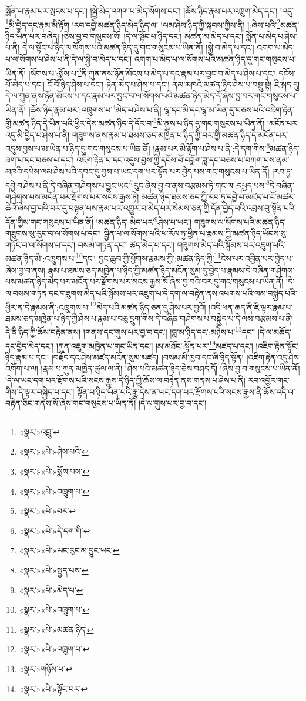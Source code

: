 སྨོན་པ་རྣམ་པར་སྤངས་པ་དང་། །སྐྱེ་མེད་འགག་པ་མེད་སོགས་དང་། །ཆོས་ཉིད་རྣམ་པར་འཁྲུག་མེད་དང་། །འདུ་\footnote{«སྣར་»འབྲུ་}མི་བྱེད་དང་རྣམ་མི་རྟོག །རབ་དབྱེ་མཚན་ཉིད་མེད་ཉིད་ལ། །ལམ་ཤེས་ཉིད་ཀྱི་སྐབས་ཀྱིས་ནི། །:ཞེས་པའི་\footnote{«སྣར་»«པེ་»ཤེས་པའི་}མཚན་ཉིད་ཡིན་པར་བཞེད། །ཅེས་བྱ་བ་གསུངས་སོ། །དེ་ལ་སྟོང་པ་ཉིད་དང་། མཚན་མ་མེད་པ་དང་། སྨོན་པ་མེད་པ་ཤེས་པ་ནི། དེ་ལ་སྟོང་པ་ཉིད་ལ་སོགས་པའི་མཚན་ཉིད་དུ་གང་གསུངས་པ་ཡིན་ནོ། །སྐྱེ་བ་མེད་པ་དང་། འགག་པ་མེད་པ་ལ་སོགས་པ་ཤེས་པ་ནི་དེ་ལ་སྐྱེ་བ་མེད་པ་དང་། འགག་པ་མེད་པ་ལ་སོགས་པའི་མཚན་ཉིད་དུ་གང་གསུངས་པ་ཡིན་ནོ། །སོགས་པ་:སྨོས་པ་\footnote{«སྣར་»«པེ་»སྨོས་པས་}ནི་ཀུན་ནས་ཉོན་མོངས་པ་མེད་པ་དང་རྣམ་པར་བྱང་བ་མེད་པ་ཤེས་པ་དང་། དངོས་པོ་མེད་པ་དང་། ངོ་བོ་ཉིད་ཤེས་པ་དང་། རྟེན་མེད་པ་ཤེས་པ་དང་། ནམ་མཁའི་མཚན་ཉིད་ཤེས་པ་བསྡུ་སྟེ། ཇི་སྐད་དུ། དེ་ལ་ཀུན་ནས་ཉོན་མོངས་པ་དང་རྣམ་པར་བྱང་བ་ལ་སོགས་པའི་མཚན་ཉིད་མེད་དོ་ཞེས་བྱ་བར་གང་གསུངས་པ་ཡིན་ནོ། །ཆོས་ཉིད་རྣམ་པར་:འཁྲུགས་པ་\footnote{«སྣར་»«པེ་»འཁྲུག་པ་}མེད་པ་ཤེས་པ་ནི། ལྷ་དང་མི་དང་ལྷ་མ་ཡིན་དུ་བཅས་པའི་འཇིག་རྟེན་གྱི་མཚན་ཉིད་དེ་ཡིན་པའི་ཕྱིར་དེས་མཚན་ཉིད་དེ་དོར་བ་\footnote{«སྣར་»«པེ་»བར་}མི་ནུས་པ་ཉིད་དུ་གང་གསུངས་པ་ཡིན་ནོ། །མངོན་པར་འདུ་མི་བྱེད་པ་ཤེས་པ་ནི། གཟུགས་ནས་རྣམ་པ་ཐམས་ཅད་མཁྱེན་པ་ཉིད་ཀྱི་བར་གྱི་མཚན་ཉིད་དེ་མངོན་པར་འདུས་བྱས་པ་མ་ཡིན་པ་ཉིད་དུ་གང་གསུངས་པ་ཡིན་ནོ། །རྣམ་པར་མི་རྟོག་པ་ཤེས་པ་ནི་:དེ་དག་གིས་\footnote{«སྣར་»«པེ་»དེ་དག་གི་}མཚན་ཉིད་ཟག་པ་དང་བཅས་པ་དང་། འཇིག་རྟེན་པ་དང་འདུས་བྱས་ཀྱི་དངོས་པོ་བཟློག་ཟླ་དང་བཅས་པ་བཀག་པས་ནམ་མཁའི་དཔེས་ལམ་ཤེས་པའི་དབང་དུ་བྱས་པ་ཡང་དག་པར་སྟོན་པར་བྱེད་པས་གང་གསུངས་པ་ཡིན་ནོ། །རབ་ཏུ་དབྱེ་བ་ཤེས་པ་ནི་དེ་བཞིན་གཤེགས་པ་བྱུང་ཡང་\footnote{«སྣར་»«པེ་»ཡང་རུང་མ་བྱུང་ཡང་}རུང་ཞེས་བྱ་བ་ནས་བརྩམས་ཏེ་གང་ལ་:དཔྱད་པས་\footnote{«སྣར་»«པེ་»སྤྱད་པས་}དེ་བཞིན་གཤེགས་པས་མངོན་པར་རྫོགས་པར་སངས་རྒྱས་ཏེ། མཚན་ཉིད་ཐམས་ཅད་ཀྱི་རབ་ཏུ་དབྱེ་བ་མཛད་པ་ངོ་མཚར་ཆེའོ་ཞེས་བྱ་བའི་བར་དུ་བསྟན་པས་རྣམ་པར་འགྱུར་བ་མེད་པར་སེམས་ཅན་གྱི་དོན་བྱེད་པའི་འབྲས་བུ་སྟོན་པའི་དོན་གྱིས་གང་གསུངས་པ་ཡིན་ནོ། །མཚན་ཉིད་:མེད་པར་\footnote{«སྣར་»«པེ་»མེད་པ་}ཤེས་པ་ཡང་། གཟུགས་ལ་སོགས་པའི་མཚན་ཉིད་གཟུགས་སུ་རུང་བ་ལ་སོགས་པ་དང་། སྦྱིན་པ་ལ་སོགས་པའི་ཕ་རོལ་ཏུ་ཕྱིན་པ་རྣམས་ཀྱི་མཚན་ཉིད་ཡོངས་སུ་གཏོང་བ་ལ་སོགས་པ་དང་། བསམ་གཏན་དང་། ཚད་མེད་པ་དང་། གཟུགས་མེད་པའི་སྙོམས་པར་འཇུག་པའི་མཚན་ཉིད་མི་:འཁྲུགས་པ་\footnote{«སྣར་»«པེ་»འཁྲུག་པ་}དང་། བྱང་ཆུབ་ཀྱི་ཕྱོགས་རྣམས་ཀྱི་:མཚན་ཉིད་ཀྱི་\footnote{«སྣར་»«པེ་»མཚན་ཉིད་}ངེས་པར་འབྱིན་པར་བྱེད་པ་ཞེས་བྱ་བ་ནས། རྣམ་པ་ཐམས་ཅད་མཁྱེན་པ་ཉིད་ཀྱི་མཚན་ཉིད་མངོན་སུམ་དུ་བྱེད་པ་རྣམས་དེ་བཞིན་གཤེགས་པས་མཚན་ཉིད་མེད་པར་མངོན་པར་རྫོགས་པར་སངས་རྒྱས་སོ་ཞེས་བྱ་བའི་བར་དུ་གང་གསུངས་པ་ཡིན་ནོ། །དེ་ལ་བསམ་གཏན་དང་གཟུགས་མེད་པའི་སྙོམས་པར་འཇུག་པ་དེ་དག་ལ་བརྟེན་ནས་འཕགས་པའི་ལམ་བསྐྱེད་པའི་ཕྱིར་ན་དེ་རྣམས་ནི་:འཁྲུགས་པ་\footnote{«སྣར་»«པེ་»འཁྲུག་པ་}མེད་པའི་མཚན་ཉིད་ཅན་དུ་ཤེས་པར་བྱའོ། །འདི་ཕན་ཆད་ནི་ཇི་ལྟར་རྣམ་པ་ཐམས་ཅད་མཁྱེན་པ་ཉིད་ཀྱི་ཤེས་པ་རྣམ་པ་བཅུ་དྲུག་གིས་དེ་བཞིན་གཤེགས་པ་བསྐྱེད་པ་དེ་ལས་བརྩམས་པ་ནི། དེ་ནི་ཉིད་ཀྱི་ཆོས་བརྟེན་ནས། །གནས་དང་གུས་པར་བྱ་བ་དང་། །བླ་མ་ཉིད་དང་:མཉེས་པ་\footnote{«སྣར་»གཉོས་པ་}དང་། །དེ་ལ་མཆོད་དང་བྱེད་མེད་དང་། །ཀུན་འཇུག་མཁྱེན་པ་གང་ཡིན་དང་། །མ་མཐོང་:སྟོན་པར་\footnote{«སྣར་»«པེ་»སྟོང་བར་}མཛད་པ་དང་། །འཇིག་རྟེན་སྟོང་ཉིད་རྣམ་པ་དང་། །བརྗོད་དང་ཤེས་མཛད་མངོན་སུམ་མཛད། །བསམ་མི་ཁྱབ་དང་ཞི་ཉིད་སྟོན། །འཇིག་རྟེན་འདུ་ཤེས་འགོག་པ་ལ། །རྣམ་པ་ཀུན་མཁྱེན་ཚུལ་ལ་ནི། །ཤེས་པའི་མཚན་ཉིད་ཅེས་བཤད་དོ། །ཞེས་བྱ་བ་གསུངས་པ་ཡིན་ནོ། །དེ་ལ་ཡང་དག་པར་རྫོགས་པའི་སངས་རྒྱས་དེ་ཉིད་ཀྱི་ཆོས་ལ་བརྟེན་ནས་གནས་པ་ཤེས་པ་ནི། རབ་འབྱོར་གང་གིས་དེ་ལྟར་བསྐྱེད་པ་དང་། སྟོན་པ་ཉིད་ཡིན་པའི་རྒྱུ་དེས་ན་ཡང་དག་པར་རྫོགས་པའི་སངས་རྒྱས་ནི་ཆོས་འདི་ལ་བརྟེན་ཅིང་གནས་སོ་ཞེས་གང་གསུངས་པ་ཡིན་ནོ། །དེ་ལ་གུས་པར་བྱ་བ་དང་། 